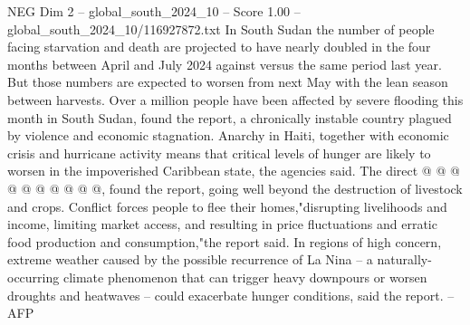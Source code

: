 \begin{textsample}{NEG Dim 2 – global\_south\_2024\_10 – Score 1.00 – global\_south\_2024\_10/116927872.txt}
In South Sudan the number of people facing starvation and death are projected to have nearly doubled in the four months between April and July 2024 against versus the same period last year.
But those numbers are expected to worsen from next May with the lean season between harvests.
Over a million people have been affected by severe flooding this month in South Sudan, found the report, a chronically instable country plagued by violence and economic stagnation.
Anarchy in Haiti, together with economic crisis and hurricane activity means that critical levels of hunger are likely to worsen in the impoverished Caribbean state, the agencies said.
The direct @ @ @ @ @ @ @ @ @ @, found the report, going well beyond the destruction of livestock and crops.
Conflict forces people to flee their homes,"disrupting livelihoods and income, limiting market access, and resulting in price fluctuations and erratic food production and consumption,"the report said.
In regions of high concern, extreme weather caused by the possible recurrence of La Nina -- a naturally-occurring climate phenomenon that can trigger heavy downpours or worsen droughts and heatwaves -- could exacerbate hunger conditions, said the report. -- AFP

\end{textsample}

